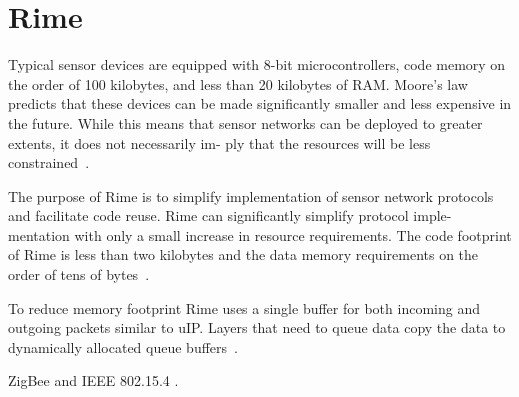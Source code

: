 
\section{Rime}\label{sec:contiki-rime}
Typical sensor devices are equipped with 8-bit microcontrollers,
code memory on the order of 100 kilobytes, and less than
20 kilobytes of RAM. Moore's law predicts that these devices
can be made significantly smaller and less expensive
in the future. While this means that sensor networks can
be deployed to greater extents, it does not necessarily im-
ply that the resources will be less constrained~\cite{paper-contiki}.

The purpose of Rime is to simplify implementation of
sensor network protocols and facilitate code reuse. 
Rime can significantly simplify protocol imple-
mentation with only a small increase in resource requirements.
The code footprint of Rime is less than two kilobytes and the
data memory requirements on the order of tens of bytes~\cite{paper-rime}.

To reduce memory footprint Rime uses a single buffer for
both incoming and outgoing packets similar to uIP. Layers
that need to queue data copy the data to dynamically
allocated queue buffers~\cite{paper-rime}.

ZigBee and IEEE 802.15.4 \cite{ieee-802.15.4}.
